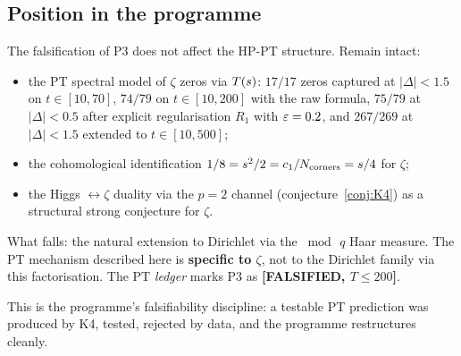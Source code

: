 \subsection{Position in the programme}
\label{sec:P3_position}

The falsification of P3 does not affect the HP-PT structure. Remain
intact:
\begin{itemize}[nosep,leftmargin=*]
\item the PT spectral model of $\zeta$ zeros via $T(s)$:
$17/17$ zeros captured at $|\Delta| < 1.5$ on $t \in [10, 70]$,
$74/79$ on $t \in [10, 200]$ with the raw formula, $75/79$ at
$|\Delta| < 0.5$ after explicit regularisation $R_1$ with
$\varepsilon = 0.2$, and $267/269$ at $|\Delta| < 1.5$ extended to
$t \in [10, 500]$;
\item the cohomological identification
$1/8 = s^{2}/2 = c_1/N_{\mathrm{corners}} = s/4$
for $\zeta$;
\item the Higgs $\leftrightarrow \zeta$ duality via the $p = 2$
channel (conjecture~\ref{conj:K4}) as a structural strong conjecture
for $\zeta$.
\end{itemize}

What falls: the natural extension to Dirichlet via the
$\bmod\,q$ Haar measure. The PT mechanism described here is
\textbf{specific to $\zeta$}, not to the Dirichlet family via this
factorisation. The PT \emph{ledger} marks P3 as
\textbf{[FALSIFIED, $T \le 200$]}.

This is the programme's falsifiability discipline: a testable PT
prediction was produced by K4, tested, rejected by data, and the
programme restructures cleanly.
